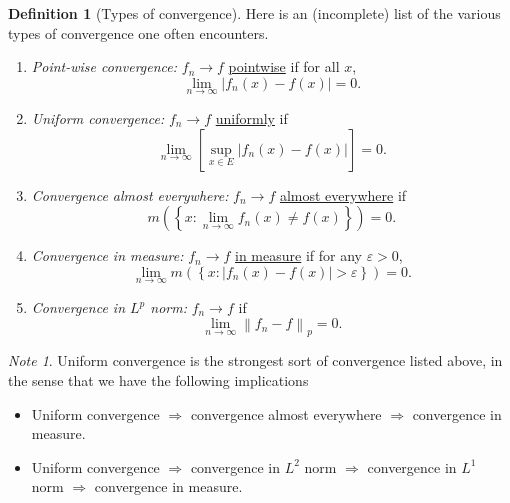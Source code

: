 \documentclass[a4paper]{scrartcl}
\newcommand{\defn}[1]{\ul{#1}}
\newcommand{\norm}[1]{\left\|#1\right\|}
\theoremstyle{definition}
\newtheorem{definition}{Definition}[section]
\theoremstyle{plain}
\theoremstyle{remark}
\newtheorem{note}{Note}[section]
\begin{document}
\begin{definition}[Types of convergence]
  \label{def:typesofconvergence}
  Here is an (incomplete) list of the various types of convergence one often encounters.
  \begin{enumerate}
    \item \emph{Point-wise convergence:} $f_{n} \to f$ \defn{pointwise} if for all $x$,
      \begin{equation*}
        \lim_{n \to \infty} \left|f_{n}(x) - f(x) \right| = 0.
      \end{equation*}

    \item \emph{Uniform convergence:} $f_{n} \to f$ \defn{uniformly} if
      \begin{equation*}
        \lim_{n \to \infty} \left[ \sup_{x \in E} \left| f_{n}(x) - f(x) \right| \right] = 0.
      \end{equation*}

    \item \emph{Convergence almost everywhere:} $f_{n} \to f$ \defn{almost everywhere} if
      \begin{equation*}
        m\left( \left\{ x\colon \lim_{n \to \infty} f_{n}(x) \neq f(x)  \right\} \right) = 0.
      \end{equation*}

    \item \emph{Convergence in measure:} $f_{n} \to f$ \defn{in measure} if for any $\varepsilon > 0$,
      \begin{equation*}
        \lim_{n \to \infty} m\left( \left\{ x\colon \left|f_{n}(x) - f(x) \right| > \varepsilon \right\} \right) = 0.
      \end{equation*}

    \item \emph{Convergence in $L^{p}$ norm:} $f_{n} \to f$ if
      \begin{equation*}
        \lim_{n \to \infty} \norm{f_{n} - f}_{p} = 0.
      \end{equation*}
  \end{enumerate}
\end{definition}

\begin{note}
  Uniform convergence is the strongest sort of convergence listed above, in the sense that we have the following implications
  \begin{itemize}
    \item Uniform convergence $\Rightarrow$ convergence almost everywhere $\Rightarrow$ convergence in measure.

    \item Uniform convergence $\Rightarrow$ convergence in $L^{2}$ norm $\Rightarrow$ convergence in $L^{1}$ norm $\Rightarrow$ convergence in measure.
  \end{itemize}
\end{note}
\end{document}
